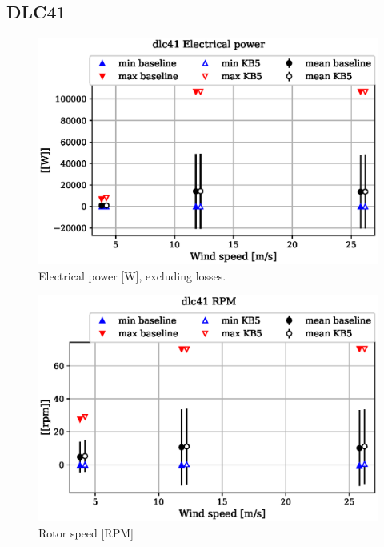 
\subsection{DLC41}
\label{sec:baseline-vs-KB6:dlc41}

\begin{figure}[!ht]
\begin{center}
	\includegraphics[width=.85\linewidth]{figures/baseline-vs-KB6/dlc41/DLL-generator_servo-inpvec-2_AA0007_AA0003.eps}
\end{center}
\caption{Electrical power [W], excluding losses.}
\label{fig:baseline-vs-KB6:dlc41:power}
\end{figure}

\begin{figure}[!ht]
\begin{center}
	\includegraphics[width=.85\linewidth]{figures/baseline-vs-KB6/dlc41/bearing-shaft_rot-angle_speed-rpm_AA0007_AA0003.eps}
\end{center}
\caption{Rotor speed [RPM]}
\label{fig:baseline-vs-KB6:dlc41:rpm}
\end{figure}

